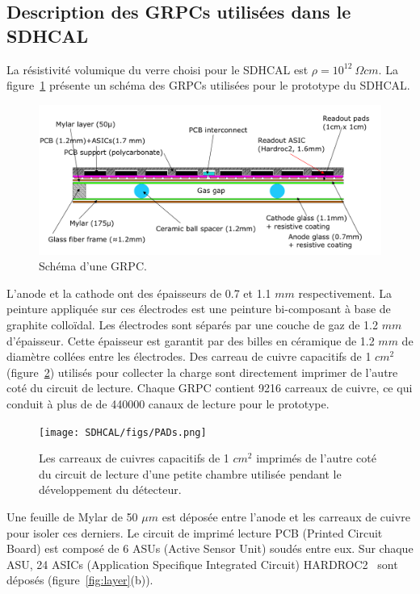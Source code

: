 \subsection{Description des GRPCs utilisées dans le SDHCAL}
La résistivité volumique du verre choisi pour le SDHCAL est $\rho=10^{12}~\Omega cm$. La figure~\ref{fig:grpc} présente un schéma des GRPCs utilisées pour le prototype du SDHCAL. 
\begin{figure}[!h]
  \begin{center}
    \includegraphics[width=.8\textwidth]{SDHCAL/figs/GRPC-K7.png}
    \caption{Schéma d'une GRPC.}
    \label{fig:grpc}
  \end{center}
\end{figure}
L'anode et la cathode ont des épaisseurs de 0.7 et 1.1 $mm$ respectivement. La peinture appliquée sur ces électrodes est une peinture bi-composant à base de graphite colloïdal. Les électrodes sont séparés par une couche de gaz de 1.2 $mm$ d'épaisseur. Cette épaisseur est garantit par des billes en céramique de 1.2 $mm$ de diamètre collées entre les électrodes. Des carreau de cuivre capacitifs de 1 $cm^2$ (figure~\ref{fig:carreaux}) utilisés pour collecter la charge sont directement imprimer de l'autre coté du circuit de lecture. Chaque GRPC contient 9216 carreaux de cuivre, ce qui conduit à plus de de 440000 canaux de lecture pour le prototype.
\begin{figure}[!h]
  \begin{center}
    \texttt{[image: SDHCAL/figs/PADs.png]}
    \caption{Les carreaux de cuivres capacitifs de 1 $cm^2$ imprimés de l'autre coté du circuit de lecture d'une petite chambre utilisée pendant le développement du détecteur.}
    \label{fig:carreaux}
  \end{center}
\end{figure}
Une feuille de Mylar de 50 $\mu m$ est déposée entre l'anode et les carreaux de cuivre pour isoler ces derniers. Le circuit de imprimé lecture PCB (Printed Circuit Board) est composé de 6 ASUs (Active Sensor Unit) soudés entre eux. Sur chaque ASU, 24 ASICs (Application Specifique Integrated Circuit) HARDROC2~\cite{omega} sont déposés (figure~\ref{fig:layer}(b)). 
